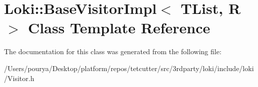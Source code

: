 \hypertarget{classLoki_1_1BaseVisitorImpl}{}\section{Loki\+:\+:Base\+Visitor\+Impl$<$ T\+List, R $>$ Class Template Reference}
\label{classLoki_1_1BaseVisitorImpl}


The documentation for this class was generated from the following file\+:\begin{DoxyCompactItemize}
\item 
/\+Users/pourya/\+Desktop/platform/repos/tetcutter/src/3rdparty/loki/include/loki/Visitor.\+h\end{DoxyCompactItemize}
